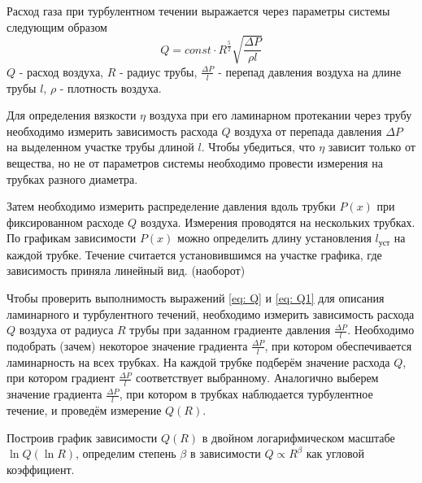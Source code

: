 Расход газа при турбулентном течении выражается через параметры системы следующим образом
\begin{equation}
    Q = const \cdot R^{\frac{5}{2}} \sqrt{\frac{\Delta P}{\rho l}} \label{eq: Q1}
\end{equation}
$Q$ - расход воздуха, $R$ - радиус трубы, $\frac{\Delta P}{l}$ - перепад давления воздуха на длине трубы $l$, $\rho$ - плотность воздуха.

Для определения вязкости $\eta$ воздуха при его ламинарном протекании через трубу необходимо измерить зависимость расхода $Q$ воздуха от перепада давления $\Delta P$ на выделенном участке трубы длиной $l$. Чтобы убедиться, что $\eta$ зависит только от вещества, но не от параметров системы необходимо провести измерения на трубках разного диаметра.

Затем необходимо измерить распределение давления вдоль трубки $P(x)$ при фиксированном расходе $Q$ воздуха. Измерения проводятся на нескольких трубках. По графикам зависимости $P(x)$ можно определить длину установления $l_\text{уст}$ на каждой трубке. Течение считается установившимся на участке графика, где зависимость приняла линейный вид. (наоборот)

Чтобы проверить выполнимость выражений \eqref{eq: Q} и \eqref{eq: Q1} для описания ламинарного и турбулентного течений, необходимо измерить зависимость расхода $Q$ воздуха от радиуса $R$ трубы при заданном градиенте давления $\frac{\Delta P}{l}$. Необходимо подобрать (зачем) некоторое значение градиента $\frac{\Delta P}{l}$, при котором обеспечивается ламинарность на всех трубках. На каждой трубке подберём значение расхода $Q$, при котором градиент $\frac{\Delta P}{l}$ соответствует выбранному. Аналогично выберем значение градиента $\frac{\Delta P}{l}$, при котором в трубках наблюдается турбулентное течение, и проведём измерение $Q(R)$. 

Построив график зависимости $Q(R)$ в двойном логарифмическом масштабе $\ln{Q}(\ln{R})$, определим степень $\beta$ в зависимости $Q \propto R^\beta$ как угловой коэффициент.